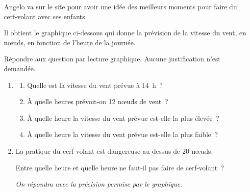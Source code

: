 \documentclass[exercice]{thedocument}%
\begin{document}
%
Angelo va sur le site  pour avoir une idée des meilleurs moments pour
faire du cerf-volant avec ses enfants.\smallskip\par\noindent
Il obtient le graphique ci-dessous qui donne la prévision de la vitesse du vent, en n\oe uds,
en fonction de l'heure de la journée.\smallskip\par\noindent
Répondre aux question par lecture graphique. Aucune justification n'est demandée.\medskip\par\noindent
{\centering{}\par}\noindent
\begin{enumerate}
    \item \begin{enumerate}
        \item Quelle est la vitesse du vent prévue à 14~h~?
        \item À quelle heures prévoit-on 12 n\oe uds de vent~?
        \item À quelle heure la vitesse du vent prévue est-elle la plus élevée~?
        \item À quelle heure la vitesse du vent prévue est-elle la plus faible~?
    \end{enumerate}
    \item La pratique du cerf-volant est dangereuse au-dessus de 20 n\oe uds. \par\noindent
    Entre quelle heure et quelle heure  ne faut-il pas faire de cerf-volant~?\par\noindent
    {\itshape On répondra avec la précision permise par le graphique.}
\end{enumerate}
\showthesource
\end{document}
